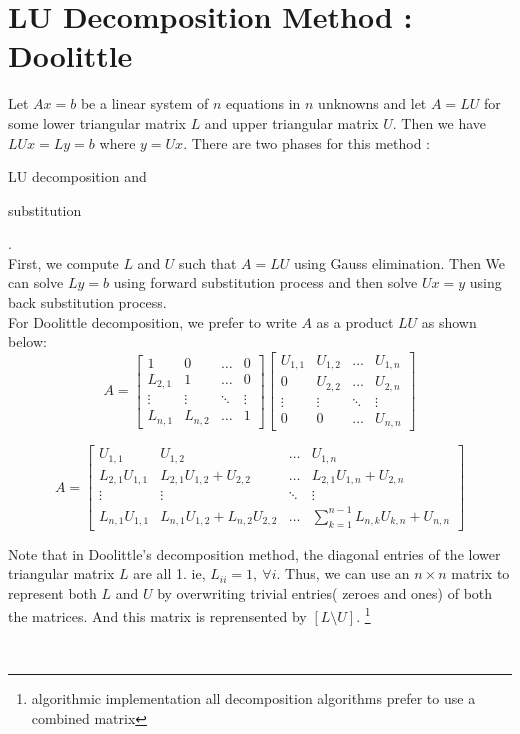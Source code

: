 \section{LU Decomposition Method : Doolittle}
	Let $Ax = b$ be a linear system of $n$ equations in $n$ unknowns and let $A = LU$ for some lower triangular matrix $L$ and upper triangular matrix $U$.
Then we have $LUx = Ly = b$ where $y = Ux$.
There are two phases for this method : \begin{enumerate*} \item LU decomposition and \item substitution \end{enumerate*}.\\

	First, we compute $L$ and $U$ such that $A = LU$ using Gauss elimination.
	Then We can solve $Ly = b$ using forward substitution process and then solve $Ux = y$ using back substitution process.\\

	For Doolittle decomposition, we prefer to write $A$ as a product $LU$ as shown below:
	\[ A = \begin{bmatrix} 1 & 0 & \dots & 0 \\ L_{2,1} & 1 & \dots & 0 \\ \vdots & \vdots & \ddots & \vdots \\ L_{n,1} & L_{n,2} & \dots & 1 \end{bmatrix} \begin{bmatrix} U_{1,1} & U_{1,2} & \dots & U_{1,n} \\ 0 & U_{2,2} & \dots & U_{2,n} \\ \vdots & \vdots & \ddots & \vdots \\ 0 & 0 & \dots & U_{n,n} \end{bmatrix} \]

		\[ A = \begin{bmatrix} U_{1,1} & U_{1,2} & \dots & U_{1,n} \\ L_{2,1}U_{1,1} & L_{2,1}U_{1,2} + U_{2,2} & \dots & L_{2,1}U_{1,n}+U_{2,n} \\ \vdots & \vdots & \ddots & \vdots \\ L_{n,1}U_{1,1} & L_{n,1}U_{1,2}+L_{n,2}U_{2,2} & \dots & \sum_{k=1}^{n-1} L_{n,k}U_{k,n}+U_{n,n} \end{bmatrix} \]

	\begin{commentary}Note that in Doolittle's decomposition method, the diagonal entries of the lower triangular matrix $L$ are all 1.
	ie, $L_{ii} = 1,\ \forall i$.
	Thus, we can use an $n \times n$ matrix to represent both $L$ and $U$ by overwriting trivial entries( zeroes and ones) of both the matrices.
	And this matrix is reprensented by $[L\text{\textbackslash{}}U]$.
	\footnote{algorithmic implementation all decomposition algorithms prefer to use a combined matrix}\end{commentary}\\

